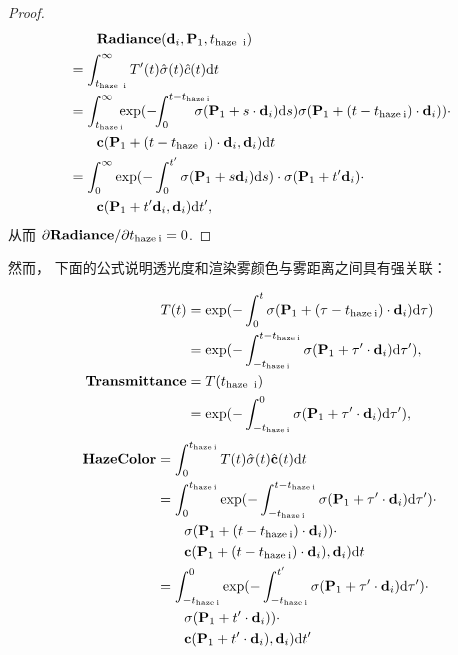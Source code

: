 \begin{appendices}
\begin{proof}
\begin{align*}
    &\qquad\mathbf{Radiance}(\mathbf{d}_i, \mathbf P_1, t_\text{haze\: i})\\
     &= \int_{t_\text{haze\: i}}^\infty T'(t)\hat{\sigma}(t)\hat{c}(t)\text{d}t \\
    &=\int_{t_\text{haze\:i}}^\infty\!\!\!\exp(-\!\!\int_{0}^{t-t_\text{haze\:i}                    }\!\!\!\!\!\!\!\!\sigma(\mathbf P_1 + s\cdot \mathbf d_i)\text ds)\sigma(\mathbf P_1 + (t-t_\text{haze\:i})\cdot\mathbf d_i))\cdot
    \\&\qquad\mathbf c(\mathbf P_1 + (t-t_\text{haze\: i})\cdot\mathbf{d}_i,\mathbf d_i)\text dt\\
    &=\int_0^\infty\exp(-\int_0^{t'}\sigma(\mathbf P_1+s\mathbf d_i)\text ds)\cdot\sigma(\mathbf P_1+t'\mathbf d_i)\cdot
    \\&\qquad\mathbf c(\mathbf P_1+t'\mathbf d_i, \mathbf d_i)\text dt',
\end{align*}
从而 $\partial\mathbf{Radiance}/\partial t_\text{haze\:i} = 0$.
\end{proof}

然而， 下面的公式说明透光度和渲染雾颜色与雾距离之间具有强关联：

\begin{align*}
    T(t) &= \exp(-\int_{0}^{t              }\sigma(\mathbf P_1 + (\tau-t_\text{haze\:i})\cdot \mathbf d_i)\text d\tau)\\
    &=\exp(-\int_{-t_\text{haze\:i}}^{t-t_\text{haze\:i}}\sigma(\mathbf P_1 + \tau'\cdot \mathbf d_i)\text d\tau'),\\
    \mathbf{Transmittance}
    &=T(t_\text{haze\: i})\\
    &=\exp(-\int_{-t_\text{haze\:i}}^{0}\sigma(\mathbf P_1 + \tau'\cdot \mathbf d_i)\text d\tau'),
\end{align*}
\begin{align*}
    \mathbf{HazeColor} &=\int_0^{t_\text{haze\:i}}T(t)\hat\sigma(t)\hat{\mathbf c}(t)\text dt\\
    &=\int_0^{t_\text{haze\:i}}\exp(-\int_{-t_\text{haze\:i}}^{t-t_\text{haze\:i}}\sigma(\mathbf P_1 + \tau'\cdot \mathbf d_i)\text d\tau')\cdot\\
    &\qquad\sigma(\mathbf P_1 + (t-t_\text{haze\:i})\cdot\mathbf d_i))\cdot\\
    &\qquad{\mathbf c}(\mathbf P_1 + (t-t_\text{haze\:i})\cdot\mathbf d_i), \mathbf d_i)\text dt\\
    &=\int_{-t_\text{haze\:i}}^0\exp(-\int_{-t_\text{haze\:i}}^{t'}\sigma(\mathbf P_1 + \tau'\cdot \mathbf d_i)\text d\tau')\cdot\\
    &\qquad\sigma(\mathbf P_1 + t'\cdot\mathbf d_i))\cdot\\
    &\qquad{\mathbf c}(\mathbf P_1 + t'\cdot\mathbf d_i), \mathbf d_i)\text dt'
\end{align*}


\end{appendices}
